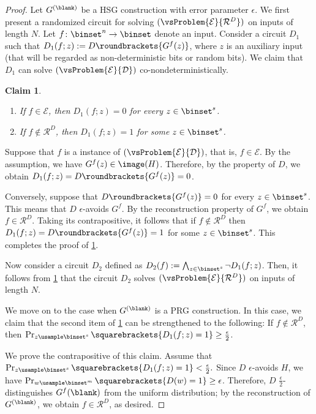 \documentclass[11pt]{article}
\numberwithin{equation}{section}
\newtheorem{claim}[theorem]{Claim}
\theoremstyle{definition}
\theoremstyle{plain}
\begin{document}
\begin{proof}
  Let $G^{(\blank)}$ be a HSG construction with error parameter $\epsilon$.
  We first present a randomized circuit for solving $(\vsProblem{\mathcal{E}}{\mathcal{R}^D})$
  on inputs of length $N$.
  Let $f \colon \binset^n \to \binset$ denote an input.
  Consider a circuit $D_1$ such that $D_1(f; z) := D\roundbrackets{ G^f(z) }$,
  where $z$ is an auxiliary input (that will be regarded as non-deterministic bits or random bits).
  We claim that $D_1$ can solve $(\vsProblem{\mathcal{E}}{\mathcal{D}})$ co-nondeterministically.
  \begin{claim}
    \label{claim_Generic}
    \hspace{0em}
    \begin{enumerate}
      \item
            If $f \in \mathcal{E}$, then $D_1(f; z) = 0$ for every $z \in \binset^s$.
      \item
            If $f \not\in \mathcal{R}^D$, then $D_1(f; z) = 1$ for some $z \in \binset^s$.
    \end{enumerate}
  \end{claim}
  Suppose that $f$ is a \Yes instance of $(\vsProblem{\mathcal{E}}{\mathcal{D}})$, that is, $f \in \mathcal{E}$.
  By the assumption, we have $G^f(z) \in \image(H)$.
  Therefore, by the property of $D$, we obtain $D_1(f; z) = D\roundbrackets{ G^f(z) } = 0$.

  Conversely, suppose that $D\roundbrackets{ G^f(z) } = 0$ for every $z \in \binset^s$.
  This means that $D$ $\epsilon$-avoids $G^f$.
  By the reconstruction property of $G^f$,
  we obtain $f \in \mathcal{R}^D$.
  Taking its contrapositive, it follows that
  if $f \not\in \mathcal{R}^D$ then $D_1(f; z) = D \roundbrackets{ G^f(z) } = 1$ for some $z \in \binset^s$.
  This completes the proof of \cref{claim_Generic}.

  Now consider a circuit $D_2$ defined as $D_2(f) := \bigwedge_{z \in \binset^s} \neg D_1(f; z)$.
  Then, it follows from \cref{claim_Generic} that the circuit $D_2$ solves $(\vsProblem{\mathcal{E}}{\mathcal{R}^D})$
  on inputs of length $N$.

  We move on to the case when $G^{(\blank)}$ is a PRG construction.
  In this case, we claim that the second item of \cref{claim_Generic} can be strengthened to the following:
  If $f \not\in \mathcal{R}^D$, then $\Pr_{z \usample \binset^s} \squarebrackets{ D_1(f; z) = 1 } \ge \frac{\epsilon}{2}$.

  We prove the contrapositive of this claim.
  Assume that $\Pr_{z \usample \binset^s} \squarebrackets{ D_1(f; z) = 1 } < \frac{\epsilon}{2} .$
  Since $D$ $\epsilon$-avoids $H$, we have $\Pr_{w \usample \binset^m} \squarebrackets{ D(w) = 1 } \ge \epsilon$.
  Therefore, $D$ $\frac{\epsilon}{2}$-distinguishes $G^f(\blank)$ from the uniform distribution;
  by the reconstruction of $G^{(\blank)}$, we obtain $f \in \mathcal{R}^D$, as desired.


\end{proof}
\end{document}
